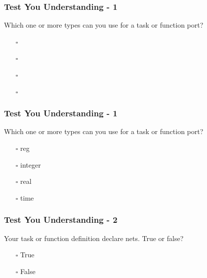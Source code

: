 \documentclass[t, notes, xcolor=table]{beamer}
\begin{document}
\begin{frame}
\frametitle{Test You Understanding - 1}
Which one or more types can you use for a task or function port?
\begin{itemize}
\item[$\square$] 
\item[$\square$] 
\item[$\square$] 
\item[$\square$] 
\end{itemize}
\end{frame}
\note{

}

\begin{frame}
\frametitle{Test You Understanding - 1}
Which one or more types can you use for a task or function port?
\begin{itemize}
\item[$\square$] reg
\item[$\square$] integer
\item[$\square$] real
\item[$\square$] time
\end{itemize}
\end{frame}

\begin{frame}
\frametitle{Test You Understanding - 2}
Your task or function definition declare nets. True or false?
\begin{itemize}
\item[$\square$] True
\item[$\square$] False
\end{itemize}
\end{frame}
\end{document}
